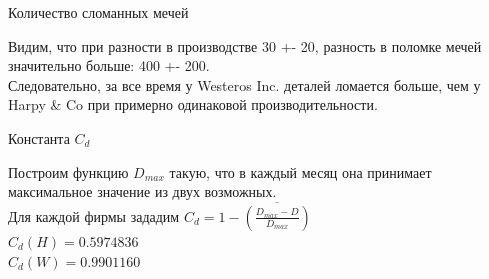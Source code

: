 \documentclass[8pt]{beamer}
\begin{document}
\begin{frame}{Количество сломанных мечей}
\begin{figure}[h]
\label{ris:4.png}
\end{figure}
Видим, что при разности в производстве 30 +- 20, разность в поломке мечей значительно больше:  400 +- 200. \\
Следовательно, за все время у {Westeros Inc.} деталей ломается больше, чем у {Harpy \& Co} при примерно одинаковой производительности.
\end{frame}

\begin{frame}{Константа $C_d$}
\begin{figure}[h]
\label{ris:5.png}
\end{figure}
Построим функцию $D_{max}$ такую, что в каждый месяц она принимает максимальное значение из двух возможных.\\
Для каждой фирмы зададим $C_d = 1 - \overline{(\frac{D_{max} - D}{D_{max}})}$\\
$C_d(H) = 0.5974836$\\
$C_d(W) = 0.9901160$
\end{frame}
\end{document}
